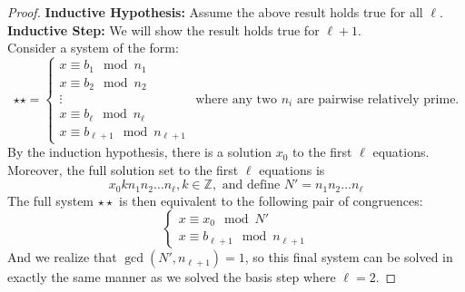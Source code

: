 \documentclass[10pt]{article}
\newcommand{\Z}{\mathbb{Z}}
\theoremstyle{definition}
\theoremstyle{remark}
\def\Z{\mathbb{ Z}}
\begin{document}
\begin{proof}
\textbf{Inductive Hypothesis:} Assume the above result holds true for all $\ell$.
\textbf{Inductive Step:} We will show the result holds true for $\ell + 1$.\\
Consider a system of the form:
$$\star\star = 
\begin{cases}
x \equiv b_1 \mod n_1\\
x \equiv b_2 \mod n_2\\
\vdots\\
x \equiv b_\ell \mod n_\ell\\
x \equiv b_{\ell+1} \mod n_{\ell+1}
\end{cases}
\text{ where any two $n_i$ are pairwise relatively prime.}
$$
By the induction hypothesis, there is a solution $x_0$ to the first $\ell$ equations.  Moreover, the full solution set to the first $\ell$ equations is $$x_0  kn_1n_2\ldots n_\ell, k \in \Z, \text{ and define } N' = n_1n_2\ldots n_\ell$$
The full system $\star\star$ is then equivalent to the following pair of congruences:
$$\begin{cases}
x \equiv x_0 \mod N'\\
x \equiv b_{\ell+1} \mod n_{\ell+1}
\end{cases}$$
And we realize that $\gcd(N',n_{\ell+1})=1$, so this final system can be solved in exactly the same manner as we solved the basis step where $\ell = 2$.
\end{proof}
\end{document}
